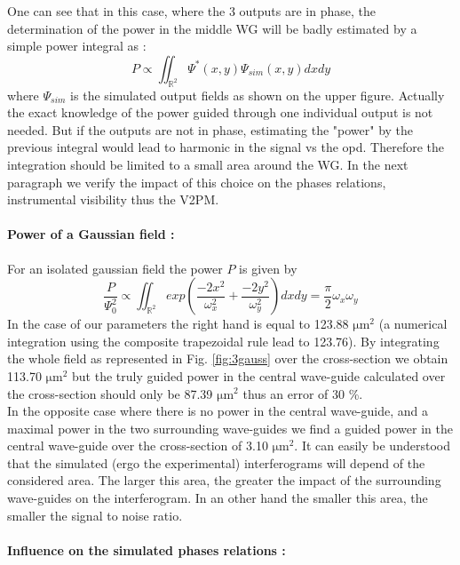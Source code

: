 One can see that in this case, where the 3 outputs are in phase, the
determination of the power in the middle WG will be badly estimated by
a simple power integral as : 
\begin{equation} \label{Eq:powerint}
P \propto \iint_{\mathbb{R}^2}
  \Psi^*(x,y)\Psi_{sim}(x,y) dxdy
  \end{equation}
  where $\Psi_{sim}$ is the simulated
output fields as shown on the upper figure. Actually the exact knowledge of the power guided through one individual output is not needed. But if the outputs are not in phase, estimating the "power" by the previous integral would lead to harmonic in the signal vs the \gls{opd}. Therefore the integration
should be limited to a small area around the WG. In the next
paragraph we verify the impact of this choice on the phases
relations, instrumental visibility thus the \gls{V2PM}.

\paragraph{Power of a Gaussian field :}

For an isolated gaussian field the power $P$ is given by \[ \frac{P}{\Psi_0^2} \propto \iint_{\mathbb{R}^2} exp\left( \frac{-2x^2}{\omega_x^2} + \frac{-2y^2}{\omega_y^2} \right) dx dy = \frac{\pi}{2} \omega_x \omega_y\]
In the case of our parameters the right hand is equal to 123.88
$\si{\micro\meter}^2$  (a numerical
integration using the composite trapezoidal rule lead to 123.76). By integrating the whole field as represented
in Fig. \ref{fig:3gauss} over the cross-section we obtain 113.70 $\si{\micro\meter}^2$ but
the truly guided power in the central wave-guide calculated over the
cross-section should only be 87.39 $\si{\micro\meter}^2$ thus an error
of 30 \%. \\
In the opposite case where there is no power in the central
wave-guide, and a maximal power in the two surrounding wave-guides we
find a  guided power in the central wave-guide over the
cross-section of 3.10 $\si{\micro\meter}^2$. It can easily be
understood that the simulated (ergo the experimental) interferograms
will depend of the considered area. The larger this area, the greater the impact of the surrounding wave-guides on the interferogram. In an other hand the smaller this area, the smaller the signal to noise ratio.

\paragraph{Influence on the simulated phases relations :}

